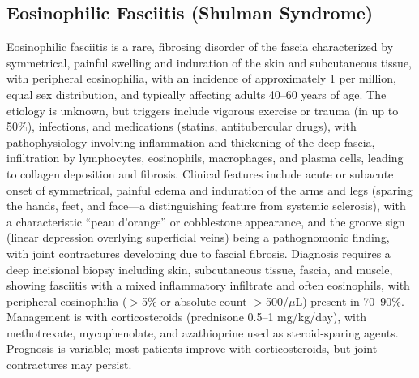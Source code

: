 \subsection{Eosinophilic Fasciitis (Shulman Syndrome)}
\label{sec:Eosinophilic Fasciitis (Shulman Syndrome)}
Eosinophilic fasciitis is a rare, fibrosing disorder of the fascia characterized by symmetrical, painful swelling and induration of the skin and subcutaneous tissue, with peripheral eosinophilia, with an incidence of approximately 1 per million, equal sex distribution, and typically affecting adults 40--60 years of age. The etiology is unknown, but triggers include vigorous exercise or trauma (in up to 50\%), infections, and medications (statins, antitubercular drugs), with pathophysiology involving inflammation and thickening of the deep fascia, infiltration by lymphocytes, eosinophils, macrophages, and plasma cells, leading to collagen deposition and fibrosis. Clinical features include acute or subacute onset of symmetrical, painful edema and induration of the arms and legs (sparing the hands, feet, and face---a distinguishing feature from systemic sclerosis), with a characteristic ``peau d'orange'' or cobblestone appearance, and the groove sign (linear depression overlying superficial veins) being a pathognomonic finding, with joint contractures developing due to fascial fibrosis. Diagnosis requires a deep incisional biopsy including skin, subcutaneous tissue, fascia, and muscle, showing fasciitis with a mixed inflammatory infiltrate and often eosinophils, with peripheral eosinophilia ($>$5\% or absolute count $>$500/$\mu$L) present in 70--90\%. Management is with corticosteroids (prednisone 0.5--1 mg/kg/day), with methotrexate, mycophenolate, and azathioprine used as steroid-sparing agents. Prognosis is variable; most patients improve with corticosteroids, but joint contractures may persist.


